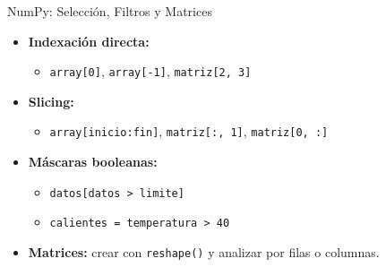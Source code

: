 \documentclass[10pt]{beamer}
\begin{document}
\begin{frame}{NumPy: Selección, Filtros y Matrices}
  \begin{itemize}
    \item \textbf{Indexación directa:}
      \begin{itemize}
        \item \texttt{array[0]}, \texttt{array[-1]}, \texttt{matriz[2, 3]}
      \end{itemize}
    \item \textbf{Slicing:}
      \begin{itemize}
        \item \texttt{array[inicio:fin]}, \texttt{matriz[:, 1]}, \texttt{matriz[0, :]}
      \end{itemize}
    \item \textbf{Máscaras booleanas:}
      \begin{itemize}
        \item \texttt{datos[datos > limite]}
        \item \texttt{calientes = temperatura > 40}
      \end{itemize}
    \item \textbf{Matrices:} crear con \texttt{reshape()} y analizar por filas o columnas.
  \end{itemize}
\end{frame}
\end{document}
